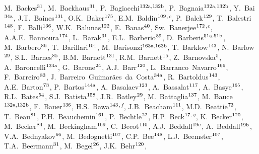 \begin{flushleft}
M.~Backes$^\textrm{\scriptsize 31}$,
M.~Backhaus$^\textrm{\scriptsize 31}$,
P.~Bagiacchi$^\textrm{\scriptsize 132a,132b}$,
P.~Bagnaia$^\textrm{\scriptsize 132a,132b}$,
Y.~Bai$^\textrm{\scriptsize 34a}$,
J.T.~Baines$^\textrm{\scriptsize 131}$,
O.K.~Baker$^\textrm{\scriptsize 175}$,
E.M.~Baldin$^\textrm{\scriptsize 109}$$^{,c}$,
P.~Balek$^\textrm{\scriptsize 129}$,
T.~Balestri$^\textrm{\scriptsize 148}$,
F.~Balli$^\textrm{\scriptsize 136}$,
W.K.~Balunas$^\textrm{\scriptsize 122}$,
E.~Banas$^\textrm{\scriptsize 40}$,
Sw.~Banerjee$^\textrm{\scriptsize 172}$$^{,e}$,
A.A.E.~Bannoura$^\textrm{\scriptsize 174}$,
L.~Barak$^\textrm{\scriptsize 31}$,
E.L.~Barberio$^\textrm{\scriptsize 89}$,
D.~Barberis$^\textrm{\scriptsize 51a,51b}$,
M.~Barbero$^\textrm{\scriptsize 86}$,
T.~Barillari$^\textrm{\scriptsize 101}$,
M.~Barisonzi$^\textrm{\scriptsize 163a,163b}$,
T.~Barklow$^\textrm{\scriptsize 143}$,
N.~Barlow$^\textrm{\scriptsize 29}$,
S.L.~Barnes$^\textrm{\scriptsize 85}$,
B.M.~Barnett$^\textrm{\scriptsize 131}$,
R.M.~Barnett$^\textrm{\scriptsize 15}$,
Z.~Barnovska$^\textrm{\scriptsize 5}$,
A.~Baroncelli$^\textrm{\scriptsize 134a}$,
G.~Barone$^\textrm{\scriptsize 24}$,
A.J.~Barr$^\textrm{\scriptsize 120}$,
L.~Barranco~Navarro$^\textrm{\scriptsize 166}$,
F.~Barreiro$^\textrm{\scriptsize 83}$,
J.~Barreiro~Guimar\~{a}es~da~Costa$^\textrm{\scriptsize 34a}$,
R.~Bartoldus$^\textrm{\scriptsize 143}$,
A.E.~Barton$^\textrm{\scriptsize 73}$,
P.~Bartos$^\textrm{\scriptsize 144a}$,
A.~Basalaev$^\textrm{\scriptsize 123}$,
A.~Bassalat$^\textrm{\scriptsize 117}$,
A.~Basye$^\textrm{\scriptsize 165}$,
R.L.~Bates$^\textrm{\scriptsize 54}$,
S.J.~Batista$^\textrm{\scriptsize 158}$,
J.R.~Batley$^\textrm{\scriptsize 29}$,
M.~Battaglia$^\textrm{\scriptsize 137}$,
M.~Bauce$^\textrm{\scriptsize 132a,132b}$,
F.~Bauer$^\textrm{\scriptsize 136}$,
H.S.~Bawa$^\textrm{\scriptsize 143}$$^{,f}$,
J.B.~Beacham$^\textrm{\scriptsize 111}$,
M.D.~Beattie$^\textrm{\scriptsize 73}$,
T.~Beau$^\textrm{\scriptsize 81}$,
P.H.~Beauchemin$^\textrm{\scriptsize 161}$,
P.~Bechtle$^\textrm{\scriptsize 22}$,
H.P.~Beck$^\textrm{\scriptsize 17}$$^{,g}$,
K.~Becker$^\textrm{\scriptsize 120}$,
M.~Becker$^\textrm{\scriptsize 84}$,
M.~Beckingham$^\textrm{\scriptsize 169}$,
C.~Becot$^\textrm{\scriptsize 110}$,
A.J.~Beddall$^\textrm{\scriptsize 19e}$,
A.~Beddall$^\textrm{\scriptsize 19b}$,
V.A.~Bednyakov$^\textrm{\scriptsize 66}$,
M.~Bedognetti$^\textrm{\scriptsize 107}$,
C.P.~Bee$^\textrm{\scriptsize 148}$,
L.J.~Beemster$^\textrm{\scriptsize 107}$,
T.A.~Beermann$^\textrm{\scriptsize 31}$,
M.~Begel$^\textrm{\scriptsize 26}$,
J.K.~Behr$^\textrm{\scriptsize 120}$,

\end{flushleft}
